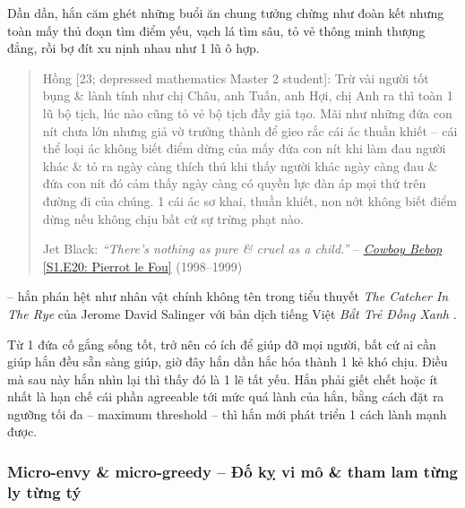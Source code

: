 \documentclass[12pt]{article}
\begin{document}
Dần dần, hắn căm ghét những buổi ăn chung tưởng chừng như đoàn kết nhưng toàn mấy thủ đoạn tìm điểm yếu, vạch lá tìm sâu, tỏ vẻ thông minh thượng đẳng, rồi bợ đít xu nịnh nhau như 1 lũ ô hợp.
\begin{quote}
	{\sf Hồng [23; depressed mathematics Master 2 student]}: Trừ vài người tốt bụng \& lành tính như chị Châu, anh Tuấn, anh Hợi, chị Anh ra thì toàn 1 lũ bộ tịch, lúc nào cũng tỏ vẻ bộ tịch đầy giả tạo. Mãi như những đứa con nít chưa lớn nhưng giả vờ trưởng thành để gieo rắc cái ác thuần khiết -- cái thể loại ác không biết điểm dừng của mấy đứa con nít khi làm đau người khác \& tỏ ra ngày càng thích thú khi thấy người khác ngày càng đau \& đứa con nít đó cảm thấy ngày càng có quyền lực đàn áp mọi thứ trên đường đi của chúng. 1 cái ác sơ khai, thuần khiết, non nớt không biết điểm dừng nếu không chịu bất cứ sự trừng phạt nào.
	
	Jet Black: {\it``There's nothing as pure \& cruel as a child.''} -- \href{https://www.imdb.com/title/tt0618976}{{\it Cowboy Bebop} [S1.E20: Pierrot le Fou]} (1998--1999)
\end{quote}
-- hắn phán hệt như nhân vật chính không tên trong tiểu thuyết {\it The Catcher In The Rye} \cite{Salinger_catcher_in_rye} của {\sc Jerome David Salinger} với bản dịch tiếng Việt {\it Bắt Trẻ Đồng Xanh} \cite{Salinger_btdx}.

Từ 1 đứa cố gắng sống tốt, trở nên có ích để giúp đỡ mọi người, bất cứ ai cần giúp hắn đều sẵn sàng giúp, giờ đây hắn dần hắc hóa thành 1 kẻ khó chịu. Điều mà sau này hắn nhìn lại thì thấy đó là 1 lẽ tất yếu. Hắn phải giết chết hoặc ít nhất là hạn chế cái phần agreeable tới mức quá lành của hắn, bằng cách đặt ra ngưỡng tối đa -- maximum threshold -- thì hắn mới phát triển 1 cách lành mạnh được.

\subsubsection{Micro-envy \& micro-greedy -- Đố kỵ vi mô \& tham lam từng ly từng tý}
\end{document}
